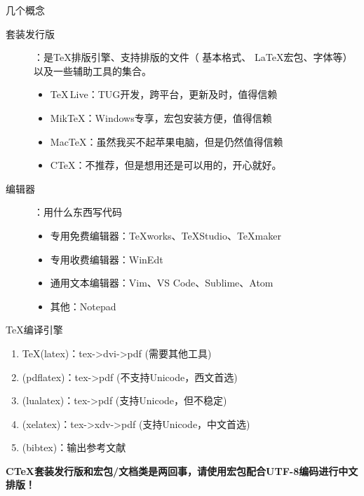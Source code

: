 \documentclass[UTF8,11pt]{beamer}
\begin{document}
\begin{frame}{几个概念}
	\begin{description}
		\item[套装发行版] ：是\TeX 排版引擎、支持排版的文件（ 基本格式、 \LaTeX 宏包、字体等）以及一些辅助工具的集合。
			\begin{itemize}
				\item {\color{red}\TeX \,Live}：TUG开发，跨平台，更新及时，值得信赖
				\item {\color{red}Mik\TeX}：Windows专享，宏包安装方便，值得信赖
				\item {\color{red}Mac\TeX}：虽然我买不起苹果电脑，但是仍然值得信赖
				\item {\color{red}CTeX}：不推荐，但是想用还是可以用的，开心就好。
			\end{itemize}
		\item[编辑器] ：用什么东西写代码
		\begin{itemize}
			\item 专用免费编辑器：TeXworks、TeXStudio、TeXmaker
			\item 专用收费编辑器：WinEdt
			\item 通用文本编辑器：Vim、VS Code、Sublime、Atom
			\item 其他：Notepad
		\end{itemize}	
	\end{description}

	
\end{frame}
\begin{frame}{\TeX 编译引擎}
	\begin{enumerate}
		\item \TeX (latex)：tex->dvi->pdf (需要其他工具)
		\item \pdfTeX (pdflatex)：tex->pdf (不支持Unicode，西文首选)
		\item \LuaTeX (lualatex)：tex->pdf (支持Unicode，但不稳定)
		\item \XeTeX (xelatex)：tex->xdv->pdf (支持Unicode，中文首选)
		\item \BibTeX (bibtex)：输出参考文献
	\end{enumerate}
	\bfseries CTeX套装发行版和\CTeX 宏包/文档类是两回事，请使用\CTeX 宏包配合UTF-8编码进行中文排版！
\end{frame}
\end{document}
